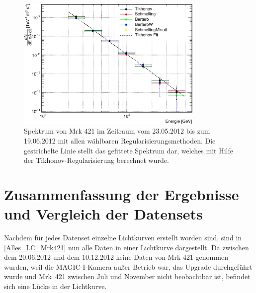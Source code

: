 \begin{figure}
    \centering
    \includegraphics[width=0.8\textwidth]{./Plots/04_MrkAnalyse/Datenset3/Datenset3_Mrk421_Spektrum.pdf}
    \caption{Spektrum von Mrk 421 im Zeitraum vom 23.05.2012 bis zum 19.06.2012 mit allen wählbaren Regularisierungsmethoden.
    Die gestrichelte Linie stellt das gefittete Spektrum dar, welches mit Hilfe der Tikhonov-Regularisierung berechnet wurde.}
    \label{Datenset3_Spektrum_Mrk421}
\end{figure}

\FloatBarrier


\section{Zusammenfassung der Ergebnisse und Vergleich der Datensets}
\label{LC_Alles}

Nachdem für jedes Datenset einzelne Lichtkurven erstellt worden sind, sind in \autoref{Alles_LC_Mrk421} nun alle Daten in einer Lichtkurve dargestellt.
Da zwischen dem 20.06.2012 und dem 10.12.2012 keine Daten von Mrk 421 genommen wurden, weil die MAGIC-I-Kamera außer Betrieb war, das Upgrade durchgeführt wurde und Mrk~421 zwischen Juli und November nicht beobachtbar ist, befindet sich eine Lücke in der Lichtkurve.

